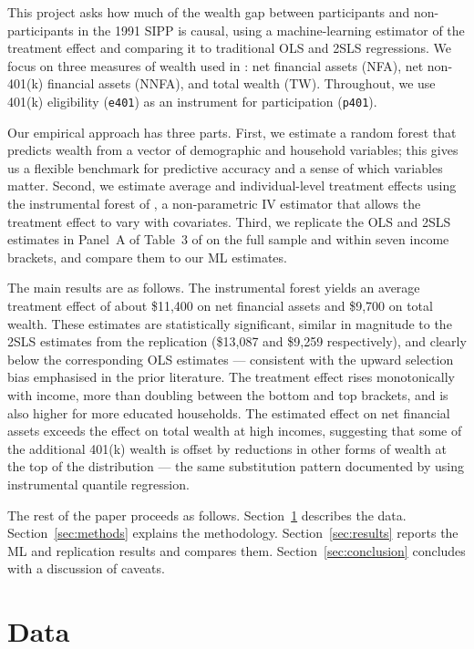 \documentclass[11pt]{article}
\begin{document}
This project asks how much of the wealth gap between participants and
non-participants in the 1991 SIPP is causal, using a machine-learning
estimator of the treatment effect and comparing it to traditional OLS and
2SLS regressions.  We focus on three measures of wealth used in
\cite{ch2004}: net financial assets (NFA), net non-401(k) financial assets
(NNFA), and total wealth (TW).  Throughout, we use 401(k) eligibility
(\texttt{e401}) as an instrument for participation (\texttt{p401}).

Our empirical approach has three parts.  First, we estimate a random forest
that predicts wealth from a vector of demographic and household variables;
this gives us a flexible benchmark for predictive accuracy and a sense of
which variables matter.  Second, we estimate average and individual-level
treatment effects using the instrumental forest of \cite{athey2019grf}, a
non-parametric IV estimator that allows the treatment effect to vary with
covariates.  Third, we replicate the OLS and 2SLS estimates in Panel~A of
Table~3 of \cite{ch2004} on the full sample and within seven income brackets,
and compare them to our ML estimates.

The main results are as follows.  The instrumental forest yields an average
treatment effect of about \$11{,}400 on net financial assets and \$9{,}700 on
total wealth.  These estimates are statistically significant, similar in
magnitude to the 2SLS estimates from the replication (\$13{,}087 and \$9{,}259
respectively), and clearly below the corresponding OLS estimates --- consistent
with the upward selection bias emphasised in the prior literature.  The
treatment effect rises monotonically with income, more than doubling between
the bottom and top brackets, and is also higher for more educated households.
The estimated effect on net financial assets exceeds the effect on total
wealth at high incomes, suggesting that some of the additional 401(k) wealth
is offset by reductions in other forms of wealth at the top of the
distribution --- the same substitution pattern documented by \cite{ch2004}
using instrumental quantile regression.

The rest of the paper proceeds as follows.  Section~\ref{sec:data} describes
the data.  Section~\ref{sec:methods} explains the methodology.
Section~\ref{sec:results} reports the ML and replication results and
compares them.  Section~\ref{sec:conclusion} concludes with a discussion of
caveats.

\section{Data}\label{sec:data}
\end{document}
